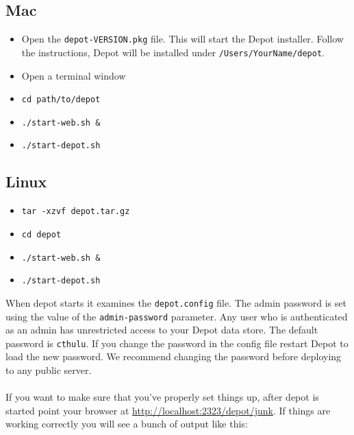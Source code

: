 \documentclass[12pt]{report}
\begin{document}
\subsection {Mac}
\begin{itemize}
\item Open the \texttt{depot-VERSION.pkg} file. This will start the
  Depot installer. Follow the instructions, Depot will be installed
  under \texttt{/Users/YourName/depot}.
\item Open a terminal window
\item \texttt{cd path/to/depot}
\item \texttt{./start-web.sh \&}
\item \texttt{./start-depot.sh}
\end{itemize}

\subsection{Linux}
\begin{itemize}
\item \texttt{tar -xzvf depot.tar.gz}
\item \texttt{cd depot}
\item \texttt{./start-web.sh \&}
\item \texttt{./start-depot.sh}
\end{itemize}

When depot starts it examines the \texttt{depot.config}
file. The admin password is set using the value of the
\texttt{admin-password} parameter. Any user who is authenticated 
as an admin has unrestricted access to your Depot data store.
The default password is \texttt{cthulu}. If you change the password
in the config file restart Depot to load the new password.
We recommend changing the password before deploying to any public server.


\paragraph{}
If you want to make sure that you've properly set things up, after
depot is started point your browser at
\url{http://localhost:2323/depot/junk}. If things are working
correctly you will see a bunch of output like this:
\end{document}
